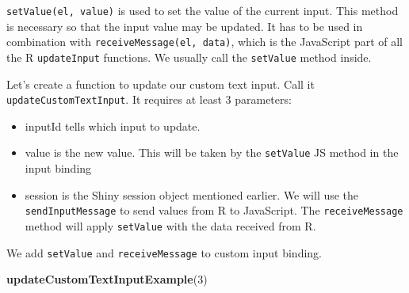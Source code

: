 \documentclass[
]{book}
\newenvironment{Shaded}{\begin{snugshade}}{\end{snugshade}}
\newcommand{\AttributeTok}[1]{\textcolor[rgb]{0.77,0.63,0.00}{#1}}
\newcommand{\ControlFlowTok}[1]{\textcolor[rgb]{0.13,0.29,0.53}{\textbf{#1}}}
\newcommand{\DataTypeTok}[1]{\textcolor[rgb]{0.13,0.29,0.53}{#1}}
\newcommand{\DecValTok}[1]{\textcolor[rgb]{0.00,0.00,0.81}{#1}}
\newcommand{\KeywordTok}[1]{\textcolor[rgb]{0.13,0.29,0.53}{\textbf{#1}}}
\newcommand{\NormalTok}[1]{#1}
\newcommand{\OperatorTok}[1]{\textcolor[rgb]{0.81,0.36,0.00}{\textbf{#1}}}
\newcommand{\OtherTok}[1]{\textcolor[rgb]{0.56,0.35,0.01}{#1}}
\newcommand{\StringTok}[1]{\textcolor[rgb]{0.31,0.60,0.02}{#1}}
\providecommand{\tightlist}{%
  \setlength{\itemsep}{0pt}\setlength{\parskip}{0pt}}
\begin{document}
\texttt{setValue(el,\ value)} is used to set the value of the current input. This method is necessary so that the input value may be updated. It has to be used in combination with \texttt{receiveMessage(el,\ data)}, which is the JavaScript part of all the R \texttt{updateInput} functions. We usually call the \texttt{setValue} method inside.

\begin{Shaded}
\end{Shaded}

Let's create a function to update our custom text input. Call it \texttt{updateCustomTextInput}. It requires at least 3 parameters:

\begin{itemize}
\tightlist
\item
  inputId tells which input to update.
\item
  value is the new value. This will be taken by the \texttt{setValue} JS method in the input binding
\item
  session is the Shiny session object mentioned earlier. We will use the \texttt{sendInputMessage} to send values from R to JavaScript. The \texttt{receiveMessage} method will apply \texttt{setValue} with the data received from R.
\end{itemize}

\begin{Shaded}
\end{Shaded}

We add \texttt{setValue} and \texttt{receiveMessage} to custom input binding.

\begin{Shaded}
\begin{Highlighting}[]
\KeywordTok{updateCustomTextInputExample}\NormalTok{(}\DecValTok{3}\NormalTok{)}
\end{Highlighting}
\end{Shaded}
\end{document}
